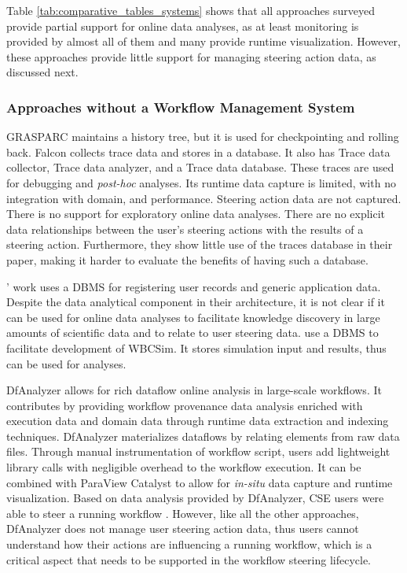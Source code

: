 


Table \ref{tab:comparative_tables_systems} shows that all approaches surveyed provide partial support for online data analyses, as at
least monitoring is provided by almost all of them and many provide runtime visualization.
However, these approaches provide little support for managing steering action data, as discussed next.




\subsubsection{Approaches without a Workflow Management System}

GRASPARC \cite{Brodlie1993GRASPARC:}
maintains a history tree, but it is used for checkpointing and rolling
back.
Falcon \cite{Gu1995Falcon:} collects trace data and stores in a database. It also has
Trace data collector, Trace data analyzer, and a Trace data database.
These traces are used for debugging and \textit{post-hoc} analyses.
Its runtime data capture is limited, with no integration with domain,
and performance. Steering action data are not
captured. There is no support for exploratory online data analyses. There
are no explicit data relationships between the user's steering actions with
the results of a steering action. Furthermore, they show little use of
the traces database in their paper, making it harder to evaluate
the benefits of having such a database.

\citet{Danani2015Computational}' work uses a DBMS for registering user records and
generic application data.
Despite the data analytical component in their architecture, it is not
clear if it can be used for online data analyses to facilitate knowledge
discovery in large amounts of scientific data and to relate to user
steering data. \citet{Shu2011Computational,Shu2006WBCSim:} use a DBMS to facilitate development of WBCSim.
It stores simulation input and results, thus can be used for analyses.

DfAnalyzer \cite{Silva2017Raw,Camata2018In,silva_dfanalyzer:_2018} allows for rich dataflow online analysis in large-scale workflows. It contributes by providing workflow provenance data analysis enriched with execution data and domain data through runtime data extraction and indexing techniques. 
DfAnalyzer materializes dataflows by relating elements from raw data files. Through manual instrumentation of workflow script, users add lightweight library calls with negligible overhead to the workflow execution. It can be combined with ParaView Catalyst to allow for \textit{in-situ} data capture and runtime visualization. Based on data analysis provided by DfAnalyzer, CSE users were able  to steer a running workflow \cite{Camata2018In}.
However, like all the other approaches, DfAnalyzer does not manage user steering action data, thus users cannot understand how their actions are influencing a running workflow, which is a critical aspect that needs to be supported in the workflow steering lifecycle. 

